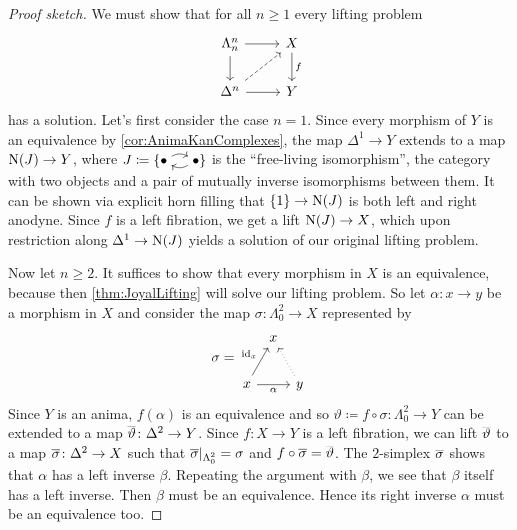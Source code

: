 \begin{proof}[Proof sketch]
	We must show that for all $n\geqslant1$ every lifting problem
	\begin{equation*}
		\begin{tikzcd}
			\Lambda_n^n\rar\dar & X\dar["f"]\\
			\Delta^n\rar\urar[dashed] & Y
		\end{tikzcd}
	\end{equation*}
	has a solution. Let's first consider the case $n=1$. Since every morphism of $Y$ is an equivalence by \cref{cor:AnimaKanComplexes}, the map $\Delta^1\rightarrow Y$ extends to a map $\operatorname{N}(J)\rightarrow Y$, where $J\coloneqq \{\InlineJ\}$ is the \enquote{free-living isomorphism}, the category with two objects and a pair of mutually inverse isomorphisms between them. It can be shown via explicit horn filling that $\{1\}\rightarrow \operatorname{N}(J)$ is both left and right anodyne. Since $f$ is a left fibration, we get a lift $\operatorname{N}(J)\rightarrow X$, which upon restriction along $\Delta^1\rightarrow \operatorname{N}(J)$ yields a solution of our original lifting problem.
	
	Now let $n\geqslant 2$. It suffices to show that every morphism in $X$ is an equivalence, because then \cref{thm:JoyalLifting} will solve our lifting problem. So let $\alpha\colon x\rightarrow y$ be a morphism in $X$ and consider the map $\sigma\colon\Lambda_0^2\rightarrow X$ represented by
	\begin{equation*}
		\sigma=\begin{tikzpicture}[commutative diagrams/every diagram,baseline=(mid.base)]
			\path node[outer sep=0.25ex] (0) at (0,0) {$x$} ++(0:3.8em) node[text depth=0pt,outer sep=0.25ex] (1) {$y$} ++ (120:3.8em) node[outer sep=0.25ex] (2) {$x$};
			\path (0) to node[pos=0.5] (mid) {} (2);
			\path[commutative diagrams/.cd, every arrow, every label]
			(0) edge node[swap] {$\alpha$} (1)
			(1) edge[dotted] (2)
			(0) edge node {$\id_x$} (2);
		\end{tikzpicture}
	\end{equation*}
	Since $Y$ is an anima, $f(\alpha)$ is an equivalence and so $\vartheta\coloneqq f\circ\sigma \colon \Lambda_0^2\rightarrow Y$ can be extended to a map $\ov\vartheta\colon \Delta^2\rightarrow Y$. Since $f\colon X\rightarrow Y$ is a left fibration, we can lift $\ov\vartheta$ to a map $\ov\sigma\colon \Delta^2\rightarrow X$ such that $\ov\sigma|_{\Lambda_0^2}=\sigma$ and $f\circ \ov\sigma=\ov\vartheta$. The $2$-simplex $\ov\sigma$ shows that $\alpha$ has a left inverse $\beta$. Repeating the argument with $\beta$, we see that $\beta$ itself has a left inverse. Then $\beta$ must be an equivalence. Hence its right inverse $\alpha$ must be an equivalence too. 
\end{proof}
